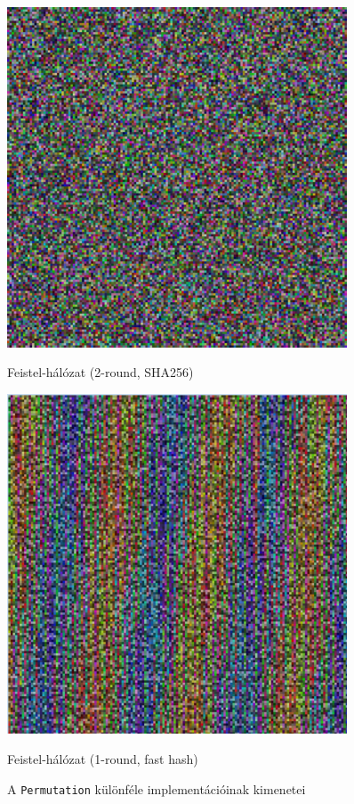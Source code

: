 \documentclass[
    parspace,
    noindent,
    nohyp,
]{elteiktdk}[2023/04/10]
\begin{document}
\begin{figure}[H]
  \vspace*{0.7cm}

  \hspace*{\fill}
  \begin{minipage}[b]{0.45\textwidth}
    \centering
    \includegraphics[width=0.9\textwidth]{image/permutation-feis2.png}
    \par Feistel-hálózat (2-round, SHA256)
  \end{minipage}
  \hspace*{\fill}
  \begin{minipage}[b]{0.45\textwidth}
    \centering
    \includegraphics[width=0.9\textwidth]{image/permutation-feif1.png}
    \par Feistel-hálózat (1-round, fast hash)
  \end{minipage}
  \hspace*{\fill}

  \caption[Permutációk kimeneteinek összehasonlítása]{
    A \texttt{Permutation} különféle implementációinak kimenetei
  }
\end{figure}
\end{document}
